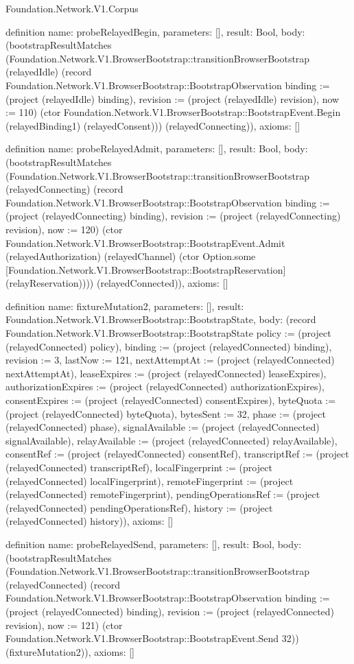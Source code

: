 \begin{lexlean}{Foundation.Network.V1.Corpus}
\begin{semanticmodule}
definition{
  name: probeRelayedBegin,
  parameters: [],
  result: Bool,
  body: (bootstrapResultMatches (Foundation.Network.V1.BrowserBootstrap::transitionBrowserBootstrap (relayedIdle) (record Foundation.Network.V1.BrowserBootstrap::BootstrapObservation {binding := (project (relayedIdle) binding), revision := (project (relayedIdle) revision), now := 110}) (ctor Foundation.Network.V1.BrowserBootstrap::BootstrapEvent.Begin (relayedBinding1) (relayedConsent))) (relayedConnecting)),
  axioms: []
}

definition{
  name: probeRelayedAdmit,
  parameters: [],
  result: Bool,
  body: (bootstrapResultMatches (Foundation.Network.V1.BrowserBootstrap::transitionBrowserBootstrap (relayedConnecting) (record Foundation.Network.V1.BrowserBootstrap::BootstrapObservation {binding := (project (relayedConnecting) binding), revision := (project (relayedConnecting) revision), now := 120}) (ctor Foundation.Network.V1.BrowserBootstrap::BootstrapEvent.Admit (relayedAuthorization) (relayedChannel) (ctor Option.some [Foundation.Network.V1.BrowserBootstrap::BootstrapReservation] (relayReservation)))) (relayedConnected)),
  axioms: []
}

definition{
  name: fixtureMutation2,
  parameters: [],
  result: Foundation.Network.V1.BrowserBootstrap::BootstrapState,
  body: (record Foundation.Network.V1.BrowserBootstrap::BootstrapState {policy := (project (relayedConnected) policy), binding := (project (relayedConnected) binding), revision := 3, lastNow := 121, nextAttemptAt := (project (relayedConnected) nextAttemptAt), leaseExpires := (project (relayedConnected) leaseExpires), authorizationExpires := (project (relayedConnected) authorizationExpires), consentExpires := (project (relayedConnected) consentExpires), byteQuota := (project (relayedConnected) byteQuota), bytesSent := 32, phase := (project (relayedConnected) phase), signalAvailable := (project (relayedConnected) signalAvailable), relayAvailable := (project (relayedConnected) relayAvailable), consentRef := (project (relayedConnected) consentRef), transcriptRef := (project (relayedConnected) transcriptRef), localFingerprint := (project (relayedConnected) localFingerprint), remoteFingerprint := (project (relayedConnected) remoteFingerprint), pendingOperationsRef := (project (relayedConnected) pendingOperationsRef), history := (project (relayedConnected) history)}),
  axioms: []
}

definition{
  name: probeRelayedSend,
  parameters: [],
  result: Bool,
  body: (bootstrapResultMatches (Foundation.Network.V1.BrowserBootstrap::transitionBrowserBootstrap (relayedConnected) (record Foundation.Network.V1.BrowserBootstrap::BootstrapObservation {binding := (project (relayedConnected) binding), revision := (project (relayedConnected) revision), now := 121}) (ctor Foundation.Network.V1.BrowserBootstrap::BootstrapEvent.Send 32)) (fixtureMutation2)),
  axioms: []
}


\end{semanticmodule}
\end{lexlean}
